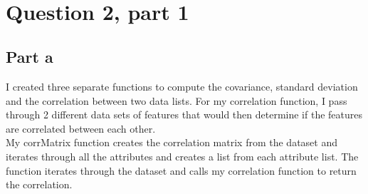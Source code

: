 \documentclass[11pt]{article}
\begin{document}
    \begin{center}
    \end{center}
    { \hspace*{\fill} \\}
    
    \begin{center}
    \end{center}
    { \hspace*{\fill} \\}
    
    \begin{center}
    \end{center}
    { \hspace*{\fill} \\}
    
    \begin{center}
    \end{center}
    { \hspace*{\fill} \\}
    
    \section{Question 2, part 1}\label{question-2-part-1}

\subsection{Part a}\label{part-a}

I created three separate functions to compute the covariance, standard
deviation and the correlation between two data lists. For my correlation
function, I pass through 2 different data sets of features that would
then determine if the features are correlated between each other.\\
My corrMatrix function creates the correlation matrix from the dataset
and iterates through all the attributes and creates a list from each
attribute list. The function iterates through the dataset and calls my
correlation function to return the correlation.
\end{document}
